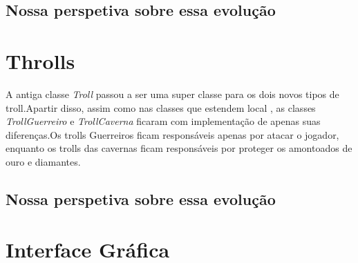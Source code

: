 \documentclass[runningheads,a4paper]{llncs}
\begin{document}
    \subsection{Nossa perspetiva sobre essa evolução}

\section{Throlls}
    A antiga classe \emph{Troll} passou a ser uma super classe para os dois novos tipos de troll.Apartir disso, assim como nas classes que estendem local , as classes \emph{TrollGuerreiro} e \emph{TrollCaverna} ficaram com implementação de apenas suas diferenças.Os trolls Guerreiros ficam responsáveis apenas por atacar o jogador, enquanto os trolls das cavernas ficam responsáveis por proteger os amontoados de ouro e diamantes. 

    \subsection{Nossa perspetiva sobre essa evolução}
    
\section{Interface Gráfica}
    
    

\nocite{*} 
\end{document}
